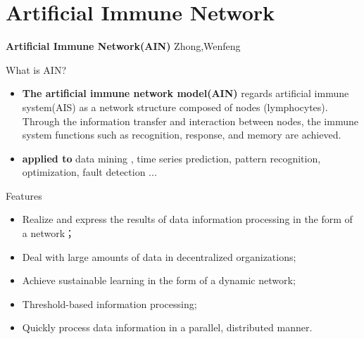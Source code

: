 
\section{Artificial Immune Network}

\begin{frame}
\huge \textbf{{Artificial Immune Network(AIN)}}
\large {Zhong,Wenfeng}
\end{frame}

\begin{frame}{What is AIN?}
\begin{itemize}
\item {\textbf{The artificial immune network model(AIN)} regards artificial immune system(AIS) as a network structure composed of nodes (lymphocytes). Through the information transfer and interaction between nodes, the immune system functions such as recognition, response, and memory are achieved.}
\item {\textbf{applied to} data mining , time series prediction, pattern recognition, optimization, fault detection ...}
\end{itemize}
\end{frame}

\begin{frame}{Features}
\begin{itemize}
\item Realize and express the results of data information processing in the form of a network；
\item Deal with large amounts of data in decentralized organizations;
\item Achieve sustainable learning in the form of a dynamic network;
\item Threshold-based information processing;
\item Quickly process data information in a parallel, distributed manner.
\end{itemize}
\end{frame}

